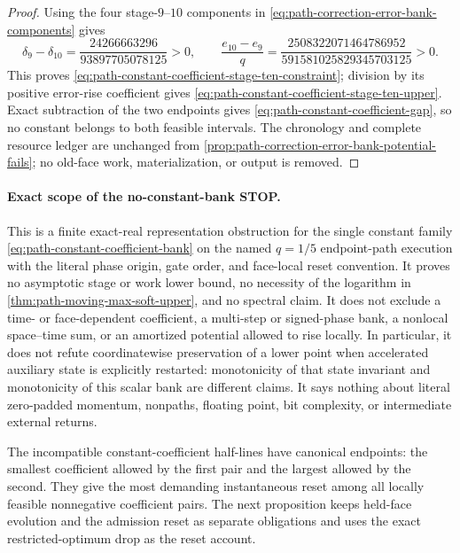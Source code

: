 \begin{proof}
Using the four stage-$9$--$10$ components in
\cref{eq:path-correction-error-bank-components} gives
\begin{equation*}
 \delta_9-\delta_{10}
 =\frac{24266663296}{93897705078125}>0,
 \qquad
 \frac{e_{10}-e_9}{q}
 =\frac{2508322071464786952}{591581025829345703125}>0.
\end{equation*}
This proves \cref{eq:path-constant-coefficient-stage-ten-constraint};
division by its positive error-rise coefficient gives
\cref{eq:path-constant-coefficient-stage-ten-upper}.  Exact subtraction of
the two endpoints gives \cref{eq:path-constant-coefficient-gap}, so no
constant belongs to both feasible intervals.  The chronology and complete
resource ledger are unchanged from
\cref{prop:path-correction-error-bank-potential-fails}; no old-face work,
materialization, or output is removed.
\end{proof}

\paragraph{Exact scope of the no-constant-bank STOP.}
This is a finite exact-real representation obstruction for the single
constant family \cref{eq:path-constant-coefficient-bank} on the named
$q=1/5$ endpoint-path execution with the literal phase origin, gate order,
and face-local reset convention.  It proves no asymptotic stage or work lower
bound, no necessity of the logarithm in
\cref{thm:path-moving-max-soft-upper}, and no spectral claim.  It does not
exclude a time- or face-dependent coefficient, a multi-step or signed-phase
bank, a nonlocal space--time sum, or an amortized potential allowed to rise
locally.  In particular, it does not refute coordinatewise preservation of a
lower point when accelerated auxiliary state is explicitly restarted:
monotonicity of that state invariant and monotonicity of this scalar bank are
different claims.  It says nothing about literal zero-padded momentum,
nonpaths, floating point, bit complexity, or intermediate external returns.

The incompatible constant-coefficient half-lines have canonical endpoints:
the smallest coefficient allowed by the first pair and the largest allowed
by the second.  They give the most demanding instantaneous reset among all
locally feasible nonnegative coefficient pairs.  The next proposition keeps
held-face evolution and the admission reset as separate obligations and uses
the exact restricted-optimum drop as the reset account.
